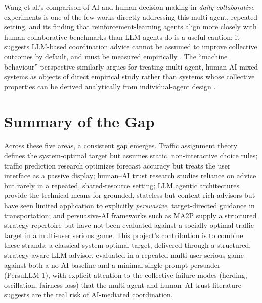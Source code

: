 \documentclass[11pt]{article}
\begin{document}
Wang et al.'s comparison of AI and human decision-making in \emph{daily collaborative} experiments is one of the few works directly addressing this multi-agent, repeated setting, and its finding that reinforcement-learning agents align more closely with human collaborative benchmarks than LLM agents do is a useful caution: it suggests LLM-based coordination advice cannot be assumed to improve collective outcomes by default, and must be measured empirically \citep{wang2025comparing}. The ``machine behaviour'' perspective similarly argues for treating multi-agent, human-AI-mixed systems as objects of direct empirical study rather than systems whose collective properties can be derived analytically from individual-agent design \citep{rahwan2019}.

\section*{Summary of the Gap}
Across these five areas, a consistent gap emerges. Traffic assignment theory defines the system-optimal target but assumes static, non-interactive choice rules; traffic prediction research optimizes forecast accuracy but treats the user interface as a passive display; human--AI trust research studies reliance on advice but rarely in a repeated, shared-resource setting; LLM agentic architectures provide the technical means for grounded, stateless-but-context-rich advisors but have seen limited application to explicitly \emph{persuasive}, target-directed guidance in transportation; and persuasive-AI frameworks such as MA2P supply a structured strategy repertoire but have not been evaluated against a socially optimal traffic target in a multi-user serious game. This project's contribution is to combine these strands: a classical system-optimal target, delivered through a structured, strategy-aware LLM advisor, evaluated in a repeated multi-user serious game against both a no-AI baseline and a minimal single-prompt persuader (PersuLLM-1), with explicit attention to the collective failure modes (herding, oscillation, fairness loss) that the multi-agent and human--AI-trust literature suggests are the real risk of AI-mediated coordination.



\end{document}
